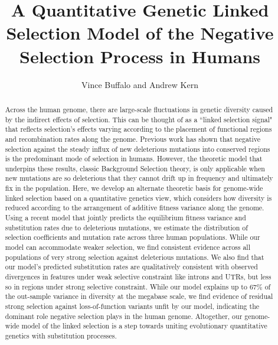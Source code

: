 \documentclass[11pt]{article}
\title{A Quantitative Genetic Linked Selection Model of the Negative Selection Process in Humans}
\author{Vince Buffalo and Andrew Kern}
\begin{document}
\maketitle



\begin{abstract}

    Across the human genome, there are large-scale fluctuations in genetic
    diversity caused by the indirect effects of selection. This can be thought
    of as a ``linked selection signal" that reflects selection's effects
    varying according to the placement of functional regions and recombination
    rates along the genome. Previous work has shown that negative selection
    against the steady influx of new deleterious mutations into conserved
    regions is the predominant mode of selection in humans. However, the
    theoretic model that underpins these results, classic Background Selection
    theory, is only applicable when new mutations are so deleterious that they
    cannot drift up in frequency and ultimately fix in the population. Here, we
    develop an alternate theoretic basis for genome-wide linked selection based
    on a quantitative genetics view, which considers how diversity is reduced
    according to the arrangement of additive fitness variance along the genome.
    Using a recent model that jointly predicts the equilibrium fitness variance
    and substitution rates due to deleterious mutations, we estimate the
    distribution of selection coefficients and mutation rate across three human
    populations. While our model can accommodate weaker selection, we find
    consistent evidence across all populations of very strong selection against
    deleterious mutations. We also find that our model's predicted substitution
    rates are qualitatively consistent with observed divergences in features
    under weak selective constraint like introns and UTRs, but less so in
    regions under strong selective constraint. While our model explains up to
    67\% of the out-sample variance in diversity at the megabase scale, we find
    evidence of residual strong selection against loss-of-function variants
    unfit by our model, indicating the dominant role negative selection plays
    in the human genome. Altogether, our genome-wide model of the linked
    selection is a step towards uniting evolutionary quantitative genetics with
    substitution processes.

\end{abstract}
\end{document}
